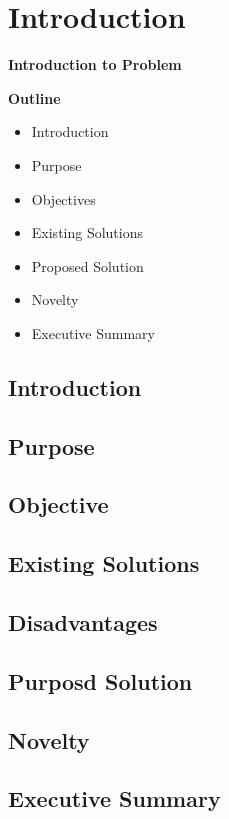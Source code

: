 
\section{Introduction}

\vspace{20mm}

\Huge{\textbf{Introduction to Problem}}

\vspace{20mm}


\begin{abstract}
	\blindtext[2]
\end{abstract}

\vspace{20mm}

\large{\textbf{Outline}}

\begin{center}
	\begin{itemize}
		\item Introduction
		\item Purpose
		\item Objectives
		\item Existing Solutions
		\item Proposed Solution
		\item Novelty
		\item Executive Summary
	\end{itemize}
\end{center}
\pagebreak


\subsection{Introduction}
\blindtext[2]

\subsection{Purpose}
\blindtext[2]

\subsection{Objective}
\blindtext[2]

\subsection{Existing Solutions}
\blindtext[1]

\subsection{Disadvantages}
\blindtext[1]

\subsection{Purposd Solution}
\blindtext[2]

\subsection{Novelty}
\blindtext[1]

\subsection{Executive Summary}
\blindtext[2]

